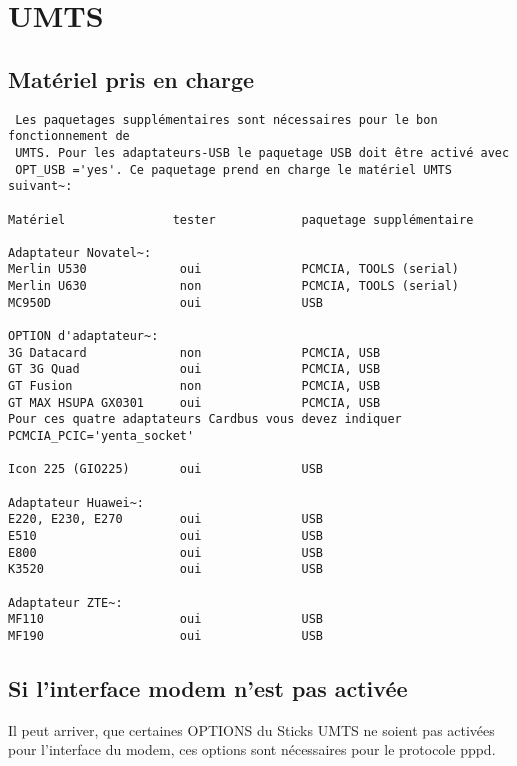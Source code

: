 
\section {UMTS}

\subsection{Matériel pris en charge}

\begin{verbatim}
 Les paquetages supplémentaires sont nécessaires pour le bon fonctionnement de
 UMTS. Pour les adaptateurs-USB le paquetage USB doit être activé avec
 OPT_USB ='yes'. Ce paquetage prend en charge le matériel UMTS suivant~:

Matériel               tester            paquetage supplémentaire

Adaptateur Novatel~:
Merlin U530             oui              PCMCIA, TOOLS (serial)
Merlin U630             non              PCMCIA, TOOLS (serial)
MC950D                  oui              USB

OPTION d'adaptateur~:
3G Datacard             non              PCMCIA, USB
GT 3G Quad              oui              PCMCIA, USB
GT Fusion               non              PCMCIA, USB
GT MAX HSUPA GX0301     oui              PCMCIA, USB
Pour ces quatre adaptateurs Cardbus vous devez indiquer PCMCIA_PCIC='yenta_socket'

Icon 225 (GIO225)       oui              USB

Adaptateur Huawei~:
E220, E230, E270        oui              USB
E510                    oui              USB
E800                    oui              USB
K3520                   oui              USB

Adaptateur ZTE~:
MF110                   oui              USB
MF190                   oui              USB
\end{verbatim}


\subsection{Si l'interface modem n'est pas activée}

 Il peut arriver, que certaines OPTIONS du Sticks UMTS ne soient pas activées
 pour l'interface du modem, ces options sont nécessaires pour le protocole pppd.

